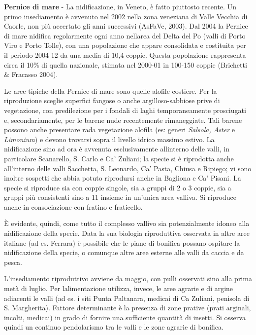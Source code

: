 \textbf{Pernice di mare} - La nidificazione, in Veneto, \`e fatto piuttosto recente. Un primo
insediamento \`e avvenuto nel 2002 nella zona veneziana di Valle
Vecchia di Caorle, non pi\`u accertato gli anni successivi (AsFaVe,
2003). Dal 2004 la Pernice di mare nidifica regolarmente ogni anno
nell{\textquotesingle}area del Delta del Po (valli di Porto Viro e
Porto Tolle), con una popolazione che appare consolidata e costituita
per il periodo 2004-12 da una media di 10,4 coppie. Questa popolazione
rappresenta circa il 10\% di quella nazionale, stimata nel 2000-01 in
100-150 coppie (Brichetti \& Fracasso 2004).

Le aree tipiche della Pernice di mare sono quelle alofile costiere. Per
la riproduzione sceglie superfici fangose o anche argilloso-sabbiose
prive di vegetazione, con predilezione per i fondali di laghi
temporaneamente prosciugati e, secondariamente, per le barene nude
recentemente rimaneggiate. Tali barene possono anche presentare rada
vegetazione alofila (es: generi \textit{Salsola, Aster }e
\textit{Limonium}) e devono trovarsi sopra il livello idrico massimo
estivo. La nidificazione sino ad ora \`e avvenuta esclusivamente
all{\textquotesingle}interno delle valli, in particolare Scanarello, S.
Carlo e Ca{\textquoteright} Zuliani; la specie si \`e riprodotta anche
all{\textquoteright}interno delle valli Sacchetta, S. Leonardo,
Ca{\textquoteright} Pasta, Chiusa e Ripiego; vi sono inoltre sospetti
che abbia potuto riprodursi anche in Bagliona e Ca{\textquoteright}
Pisani. La specie si riproduce sia con coppie singole, sia a gruppi di
2 o 3 coppie, sia a gruppi pi\`u consistenti sino a 11 insieme in
un{\textquoteright}unica area valliva. Si riproduce anche in
consociazione con fratino e fraticello.

\`E evidente, quindi, come tutto il complesso vallivo sia potenzialmente
idoneo alla nidificazione della specie. Data la sua biologia
riproduttiva osservata in altre aree italiane (ad es. Ferrara) \`e
possibile che le piane di bonifica possano ospitare la nidificazione
della specie, o comunque altre aree esterne alle valli da caccia e da
pesca.

L{\textquoteright}insediamento riproduttivo avviene da maggio, con pulli
osservati sino alla prima met\`a di luglio. Per
l{\textquotesingle}alimentazione utilizza, invece, le aree agrarie e di
argine adiacenti le valli (ad es. i siti Punta Paltanara, medicai di
Ca{\textquotesingle} Zuliani, penisola di S. Margherita). Fattore
determinante \`e la presenza di zone prative (prati arginali, incolti,
medicai) in grado di fornire una sufficiente quantit\`a di insetti. Si
osserva quindi un continuo pendolarismo tra le valli e le zone agrarie
di bonifica.

